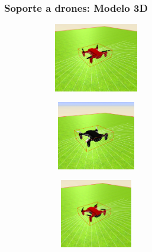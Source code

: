 \documentclass[xcolor={table}]{beamer}
\begin{document}
    	   \begin{frame}
			\frametitle{Soporte a drones: Modelo 3D}
          \begin{figure}[H]
        \centering
        \begin{subfigure}{\textwidth}
         \includegraphics[width=4cm, height=3cm]{img/red_drone.png}
 \label{fig:drone_rojo}
        \end{subfigure}
        \begin{subfigure}{\textwidth}
         \includegraphics[width=4cm, height=3cm]{img/black_drone.png}
   \label{fig:drone_negro}
        \end{subfigure}
        \begin{subfigure}{\textwidth}
         \includegraphics[width=4cm, height=3cm]{img/red_blackdrone.png}
   \label{fig:drone_negrorojo}
        \end{subfigure}
    \end{figure}
    	\end{frame}
		   
\end{document}
